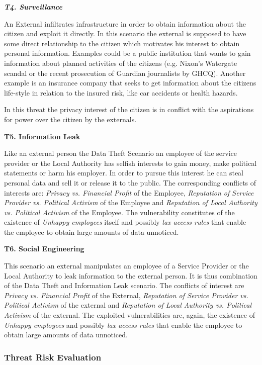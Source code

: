 \documentclass[runningheads,a4paper]{llncs}
\newenvironment{LGContent}
{ \par\color{blue} \it \small }
{ \par }
\begin{document}
\begin{LGContent}
\textbf{T4. Surveillance}

An External infiltrates infrastructure in order to obtain information
about the citizen and exploit it directly.  In this scenario the
external is supposed to have some direct relationship to the citizen
which motivates his interest to obtain personal information.  Examples
could be a public institution that wants to gain information about
planned activities of the citizens (e.g. Nixon's Watergate scandal or
the recent prosecution of Guardian journalists by GHCQ).  Another
example is an insurance company that seeks to get information about
the citizens life-style in relation to the insured risk, like car
accidents or health hazards.

In this threat the privacy interest of the citizen is in conflict with
the aspirations for power over the citizen by the externals.

\textbf{T5. Information Leak}

Like an external person the Data Theft Scenario an employee of the
service provider or the Local Authority has selfish interests to gain
money, make political statements or harm his employer.  In order to
pursue this interest he can steal personal data and sell it or release
it to the public.  The corresponding conflicts of interests are:
\textit{Privacy vs. Financial Profit} of the Employee, \textit{Reputation of Service
  Provider vs. Political Activism} of the Employee and \textit{Reputation of Local
  Authority vs. Political Activism} of the Employee.  The vulnerability constitutes of
the existence of \textit{Unhappy employees} itself and possibly \textit{lax access
rules} that enable the employee to obtain large amounts of data
unnoticed.

\textbf{T6. Social Engineering}

This scenario an external manipulates an employee of a Service
Provider or the Local Authority to leak information to the external
person.  It is thus combination of the Data Theft and Information Leak
scenario.
The conflicts of interest are \textit{Privacy vs. Financial Profit} of
the External, \textit{Reputation of Service Provider vs. Political
  Activism} of the external and \textit{Reputation of Local Authority
  vs. Political Activism} of the external.  The exploited
vulnerabilities are, again, the existence of \textit{Unhappy
  employees} and possibly \textit{lax access rules} that enable the
employee to obtain large amounts of data unnoticed.


\subsubsection{Threat Risk Evaluation}


\end{LGContent}
\end{document}
